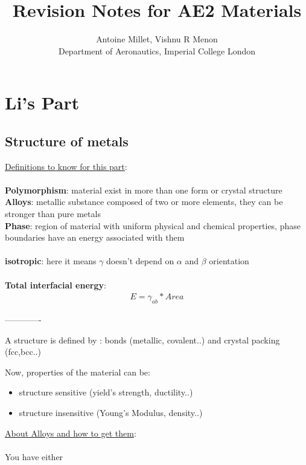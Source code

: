 \documentclass{summary_notes}
\begin{document}
\title{\textbf{Revision Notes for AE2 Materials}}
\author{Antoine Millet, Vishnu R Menon\\ 
\small{Department of Aeronautics, Imperial College London}}

\maketitle
\tableofcontents

\newpage
\section{Li's Part}
\subsection{Structure of metals}

\underline{Definitions to know for this part}:\\
\\
\textbf{Polymorphism}: material exist in more than one form or crystal structure
\\
\textbf{Alloys}: metallic substance composed of two or more elements, they can be stronger than pure metals 
\\
\textbf{Phase}: region of material with uniform physical and chemical properties, phase boundaries have an energy associated with them\\
\\
\textbf{isotropic}: here it means $\gamma$ doesn't depend on $\alpha$ and $\beta$ orientation\\
\\
\textbf{Total interfacial energy}: 
\begin{align}
    E= \gamma_{ab}*Area 
    \end{align}

\vspace{0.25cm}
-------------
\vspace{0.25cm}

A structure is defined by : bonds (metallic, covalent..) and crystal packing (fcc,bcc..)

Now, properties of the material can be:
\begin{itemize}
\item structure sensitive (yield's strength, ductility..)
\item structure insensitive (Young's Modulus, density..)
\end{itemize}

\underline{About Alloys and how to get them}:\\
\\
You have either\\
\end{document}
